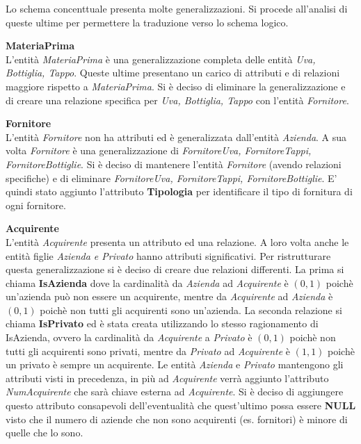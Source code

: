 Lo schema concenttuale presenta molte generalizzazioni. Si procede all'analisi di queste ultime per permettere la traduzione verso lo schema logico.
\begin{flushleft}
	\textbf{\large{MateriaPrima}}\\
	L'entità \emph{MateriaPrima} è una generalizzazione completa delle entità \emph{Uva, Bottiglia, Tappo}. Queste ultime presentano un carico di attributi e di relazioni maggiore rispetto a \emph{MateriaPrima}. Si è deciso di eliminare la generalizzazione e di creare una relazione specifica per \emph{Uva, Bottiglia, Tappo} con l'entità \emph{Fornitore}.
\end{flushleft}

\begin{flushleft}
	\textbf{\large{Fornitore}}\\
	L'entità \emph{Fornitore} non ha attributi ed è generalizzata dall'entità \emph{Azienda}. A sua volta \emph{Fornitore} è una generalizzazione di \emph{FornitoreUva, FornitoreTappi, FornitoreBottiglie}. Si è deciso di mantenere l'entità \emph{Fornitore} (avendo relazioni specifiche) e di eliminare \emph{FornitoreUva, FornitoreTappi, FornitoreBottiglie}. E' quindi stato aggiunto l'attributo \textbf{Tipologia} per identificare il tipo di fornitura di ogni fornitore.
\end{flushleft}


\begin{flushleft}
	\textbf{\large{Acquirente}}\\
	L'entità \emph{Acquirente} presenta un attributo ed una relazione. A loro volta anche le entità figlie \emph{Azienda e Privato} hanno attributi significativi. Per ristrutturare questa generalizzazione si è deciso di creare due relazioni differenti. La prima si chiama \textbf{IsAzienda} dove la cardinalità da \emph{Azienda} ad \emph{Acquirente} è $(0,1)$ poichè un'azienda può non essere un acquirente, mentre da \emph{Acquirente} ad \emph{Azienda} è $(0,1)$ poichè non tutti gli acquirenti sono un'azienda.
	La seconda relazione si chiama \textbf{IsPrivato} ed è stata creata utilizzando lo stesso ragionamento di IsAzienda, ovvero la cardinalità da \emph{Acquirente} a \emph{Privato} è $(0,1)$ poichè non tutti gli acquirenti sono privati, mentre da \emph{Privato} ad \emph{Acquirente} è $(1,1)$ poichè un privato è sempre un acquirente. Le entità \emph{Azienda} e \emph{Privato} mantengono gli attributi visti in precedenza, in più ad \emph{Acquirente} verrà aggiunto l'attributo \emph{NumAcquirente} che sarà chiave esterna ad \emph{Acquirente}. Si è deciso di aggiungere questo attributo consapevoli dell'eventualità che quest'ultimo possa essere \textbf{NULL} visto che il numero di aziende che non sono acquirenti (es. fornitori) è minore di quelle che lo sono.
\end{flushleft}

